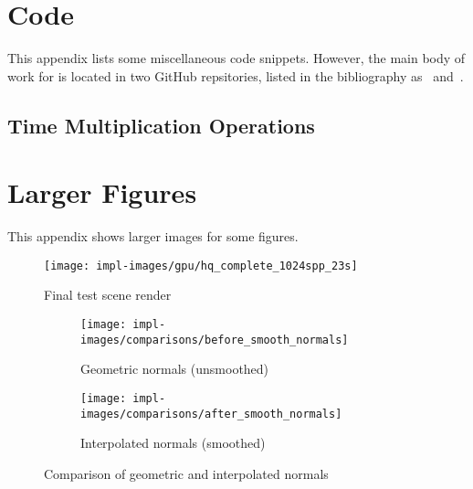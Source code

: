 %
%

\chapter{Code}\label{appendix:code}
This appendix lists some miscellaneous code snippets.
However, the main body of work for \name{} is located in two GitHub repsitories, listed in the bibliography as~\cite{raytermCpuImpl} and~\cite{raytermGpuImpl}.


\section{Time Multiplication Operations}\label{appendix:timemul}


\chapter{Larger Figures}\label{appendix:large_figures}
This appendix shows larger images for some figures.

\vspace{0.3em}
\begin{figure}[htb]
  \centering
  \texttt{[image: impl-images/gpu/hq\_complete\_1024spp\_23s]}
  \caption{Final test scene render}
\label{fig:rayterm-gpu_final_render_large}
\end{figure}

\vspace{0.3em}
\begin{figure}[htb]
  \centering
  \begin{subfigure}[htb]{\textwidth}
    \texttt{[image: impl-images/comparisons/before\_smooth\_normals]}
    \caption{Geometric normals (unsmoothed)}
\label{fig:rayterm-gpu_unsmoothed_normals_large}
  \end{subfigure}
  \begin{subfigure}[htb]{\textwidth}
    \texttt{[image: impl-images/comparisons/after\_smooth\_normals]}
    \caption{Interpolated normals (smoothed)}
\label{fig:rayterm-gpu_smoothed_normals_large}
  \end{subfigure}
  \caption{Comparison of geometric and interpolated normals}
\label{fig:rayterm-gpu_smooth_normal_comparison_large}
\end{figure}

